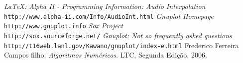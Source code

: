 \begin{thebibliography}{9}

		\emph{\LaTeX: Alpha II - Programming Information: Audio Interpolation}\\
		\texttt{http://www.alpha-ii.com/Info/AudioInt.html}
		\emph{Gnuplot Homepage}\\
		\texttt{http://www.gnuplot.info}
		\emph{Sox Project}\\
		\texttt{http://sox.sourceforge.net/}
		\emph{Gnuplot: Not so frequently asked questions}\\
		\texttt{http://t16web.lanl.gov/Kawano/gnuplot/index-e.html}
		Frederico Ferreira Campos filho;
		\emph{Algoritmos Numéricos}.
		LTC,
		Segunda Edição,
		2006.
\end{thebibliography}

